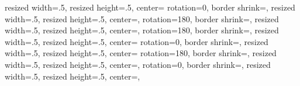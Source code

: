{{    resized width=.5\pgfphysicalwidth,%
    resized height=.5\pgfphysicalheight,%
    center=\pgfpoint{.75\pgfphysicalwidth}{.75\pgfphysicalheight}%
  }%
  {%
    rotation=0,%
    border shrink=\pgfpageoptionborder,%
    resized width=.5\pgfphysicalwidth,%
    resized height=.5\pgfphysicalheight,%
    center=\pgfpoint{.25\pgfphysicalwidth}{.25\pgfphysicalheight},%
  }%
  {%
    rotation=180,%
    border shrink=\pgfpageoptionborder,%
    resized width=.5\pgfphysicalwidth,%
    resized height=.5\pgfphysicalheight,%
    center=\pgfpoint{.75\pgfphysicalwidth}{.25\pgfphysicalheight},%
  }%
  {%
    rotation=180,%
    border shrink=\pgfpageoptionborder,%
    resized width=.5\pgfphysicalwidth,%
    resized height=.5\pgfphysicalheight,%
    center=\pgfpoint{.25\pgfphysicalwidth}{.75\pgfphysicalheight}%
  }%
  {%
    rotation=0,%
    border shrink=\pgfpageoptionborder,%
    resized width=.5\pgfphysicalwidth,%
    resized height=.5\pgfphysicalheight,%
    center=\pgfpoint{.75\pgfphysicalwidth}{.75\pgfphysicalheight}%
  }%
  {%
    rotation=180,%
    border shrink=\pgfpageoptionborder,%
    resized width=.5\pgfphysicalwidth,%
    resized height=.5\pgfphysicalheight,%
    center=\pgfpoint{.25\pgfphysicalwidth}{.25\pgfphysicalheight},%
  }%
  {%
    rotation=0,%
    border shrink=\pgfpageoptionborder,%
    resized width=.5\pgfphysicalwidth,%
    resized height=.5\pgfphysicalheight,%
    center=\pgfpoint{.75\pgfphysicalwidth}{.25\pgfphysicalheight},%
  }%
}


\renewcommand{\clearcard}{\cleardoublepage}
